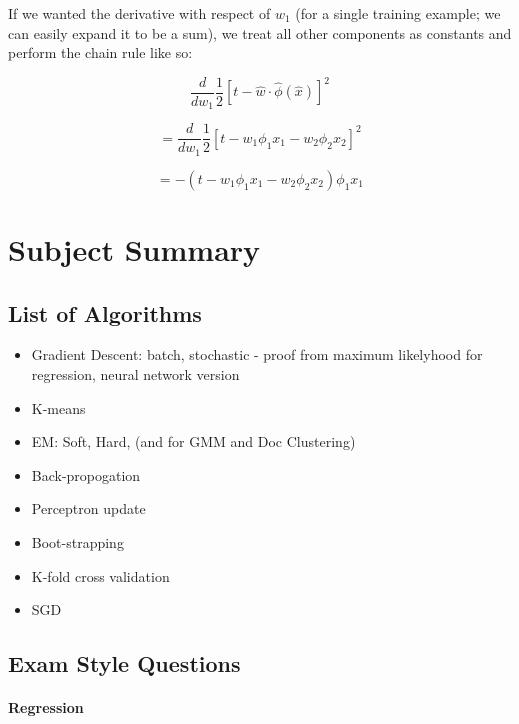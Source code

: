 \documentclass[a4paper]{article}
\begin{document}
	If we wanted the derivative with respect of $w_1$ (for a single training example; we can easily expand it to be a sum), we treat all other components as constants and perform the chain rule like so:
	
	$$\frac{d}{dw_1}\frac{1}{2}[t - \hat{w} \cdot \hat{\phi}(\hat{x})]^2$$
	
	$$= \frac{d}{dw_1}\frac{1}{2}[t - w_1\phi_1x_1 - w_2\phi_2x_2]^2$$
	
	
	$$= -(t - w_1\phi_1x_1 - w_2\phi_2x_2)\phi_1x_1 $$
	
	\section{Subject Summary}
	
	\subsection{List of Algorithms}
	
	\begin{itemize}
	\item Gradient Descent: batch, stochastic - proof from maximum likelyhood for regression, neural network version 
	\item K-means 
	\item EM: Soft, Hard, (and for GMM and Doc Clustering)
	\item Back-propogation
	\item Perceptron update
	\item Boot-strapping
	\item K-fold cross validation
	\item SGD
    \end{itemize}
	
	\subsection{Exam Style Questions}
    
    \paragraph{Regression}
    
\end{document}
